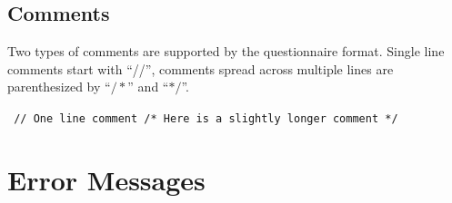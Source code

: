 \documentclass[11pt,a4paper,titlepage]{article}
\begin{document}
\subsection{Comments}

Two types of comments are supported by the questionnaire format. Single line comments start with ``//'', comments spread across multiple lines are parenthesized by ``\texttt{$/*$}'' and ``\texttt{$*/$}''.

\begin{center}
	\begin{tcolorbox}[colback=black!10!white,colframe=black!50!white, boxsep=1pt,left=4pt,right=4pt,top=4pt,bottom=2pt]
		\texttt{\noindent
			// One line comment\newline
			\newline
			/* Here is a\newline
			slightly longer\newline
			comment */
		}
	\end{tcolorbox}
\end{center}


\newpage

\section{Error Messages}
\end{document}

